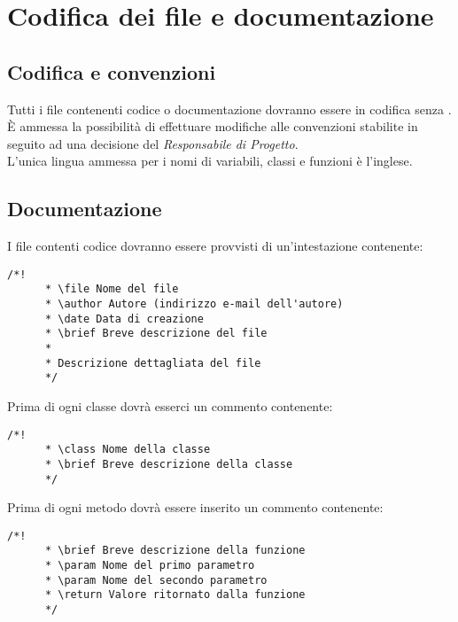 \section{Codifica dei file e documentazione}
  \subsection{Codifica e convenzioni}
  Tutti i file contenenti codice o documentazione dovranno essere in codifica  senza .\\
  È ammessa la possibilità di effettuare modifiche alle convenzioni stabilite in seguito ad una decisione del \emph{Responsabile di Progetto}.\\
  L’unica lingua ammessa per i nomi di variabili, classi e funzioni è l’inglese.
  \subsection{Documentazione}
    I file contenti codice dovranno essere provvisti di un'intestazione contenente:
    \begin{lstlisting}[frame=single]
      /*!
      * \file Nome del file
      * \author Autore (indirizzo e-mail dell'autore)
      * \date Data di creazione
      * \brief Breve descrizione del file
      *
      * Descrizione dettagliata del file
      */
    \end{lstlisting}
    Prima di ogni classe dovrà esserci un commento contenente:
    \begin{lstlisting}[frame=single]
      /*!
      * \class Nome della classe
      * \brief Breve descrizione della classe
      */
    \end{lstlisting}
    Prima di ogni metodo dovrà essere inserito un commento contenente:
    \begin{lstlisting}[frame=single]
      /*!
      * \brief Breve descrizione della funzione
      * \param Nome del primo parametro
      * \param Nome del secondo parametro
      * \return Valore ritornato dalla funzione
      */
    \end{lstlisting}
